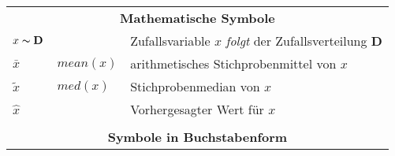 \begin{longtable}{p{}p{}p{}}
	\multicolumn{3}{c}{\textbf{Mathematische Symbole}} \\
  $x\thicksim \mathbf{D}$   &              & Zufallsvariable $x$ \textit{folgt} der Zufallsverteilung $\mathbf{D}$ \\
  $\bar{x}$        &  $mean(x)$    & arithmetisches Stichprobenmittel von $x$\\
  $\tilde{x}$      &  $med(x)$     & Stichprobenmedian von $x$\\
  $\hat{x}$        &               & Vorhergesagter Wert für $x$\\
                   &               & \\
	\multicolumn{3}{c}{\textbf{Symbole in Buchstabenform}} \\


\end{longtable}
